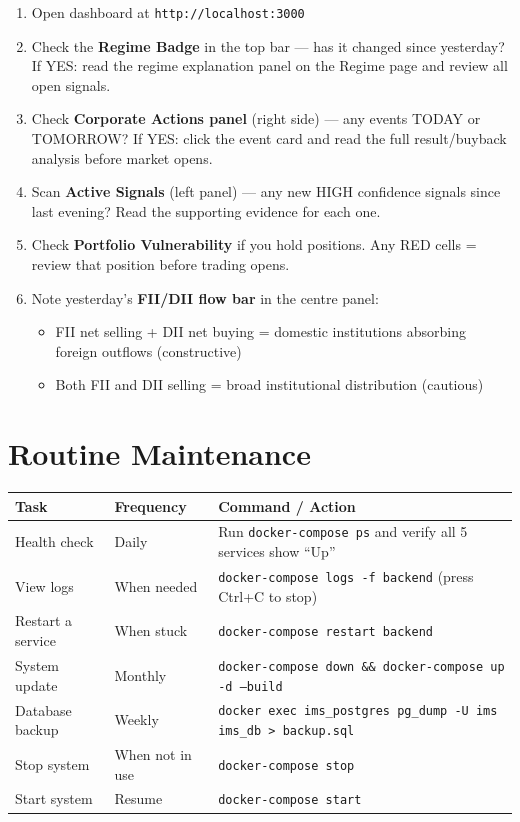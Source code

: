 \documentclass[12pt, a4paper]{report}
\begin{document}
\begin{enumerate}[label=$\square$ \arabic*.]
\item Open dashboard at \texttt{http://localhost:3000}
\item Check the \textbf{Regime Badge} in the top bar --- has it changed since yesterday? If YES: read the regime explanation panel on the Regime page and review all open signals.
\item Check \textbf{Corporate Actions panel} (right side) --- any events TODAY or TOMORROW? If YES: click the event card and read the full result/buyback analysis before market opens.
\item Scan \textbf{Active Signals} (left panel) --- any new HIGH confidence signals since last evening? Read the supporting evidence for each one.
\item Check \textbf{Portfolio Vulnerability} if you hold positions. Any RED cells = review that position before trading opens.
\item Note yesterday's \textbf{FII/DII flow bar} in the centre panel:
  \begin{itemize}
  \item FII net selling + DII net buying = domestic institutions absorbing foreign outflows (constructive)
  \item Both FII and DII selling = broad institutional distribution (cautious)
  \end{itemize}
\end{enumerate}

\chapter{Routine Maintenance}

\begin{longtable}{p{3cm} p{3cm} p{7cm}}
\toprule
\textbf{Task} & \textbf{Frequency} & \textbf{Command / Action} \\
\midrule
Health check & Daily & Run \texttt{docker-compose ps} and verify all 5 services show ``Up'' \\
View logs & When needed & \texttt{docker-compose logs -f backend} (press Ctrl+C to stop) \\
Restart a service & When stuck & \texttt{docker-compose restart backend} \\
System update & Monthly & \texttt{docker-compose down \&\& docker-compose up -d --build} \\
Database backup & Weekly & \texttt{docker exec ims\_postgres pg\_dump -U ims ims\_db > backup.sql} \\
Stop system & When not in use & \texttt{docker-compose stop} \\
Start system & Resume & \texttt{docker-compose start} \\
\bottomrule
\end{longtable}
\end{document}
